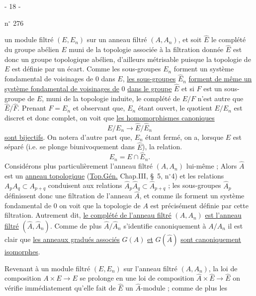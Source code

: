 \begin{center}- 18 -\end{center}
\hfill n$^\circ$ 276

un module filtré $(E,E_n)$ sur un anneau filtré $(A,A_n)$, et soit $\hat E$ le complété du groupe abélien $E$ muni de la topologie associée à la filtration donnée $\hat E$ est donc un groupe topologique abélien, d'ailleurs métrisable puisque la topologie de $E$ est définie par un écart. Comme les sous-groupes $E_n$ forment un système fondamental de voisinages de 0 dans $E$, \uline{les sous-groupes} $\hat E_n$ \uline{forment de même un système fondamental de voisinages de} 0 \uline{dans le groupe} $\hat E$ et si $F$ est un sous-groupe de $E$, muni de la topologie induite, le complété de $E/F$ n'est autre que $\hat E/\hat F$. Prenant $F=E_n$ et observant que, $E_n$ étant ouvert, le quotient $E/E_n$ est discret et donc complet, on voit que \uline{les homomorphismes canoniques}
\[
E/E_n\longrightarrow\hat E/\hat E_n
\]
\uline{sont bijectifs}. On notera d'autre part que, $E_n$ étant fermé, on a, lorsque $E$ est séparé (i.e. se plonge biunivoquement dans $\hat E$), la relation.
\[
E_n=E\cap\hat E_n.
\]
Considérons plus particulièrement l'anneau filtré $(A,A_n)$ lui-même ; Alors $\hat A$ est un \uline{anneau topologique} (\uline{Top.Gén.} Chap.III, \S\ 5, n$^\circ$4) et les relations $A_pA_q\subset A_{p+q}$ conduisent aux relations $\hat A_p\hat A_q\subset\hat A_{p+q}$ ; les sous-groupes $\hat A_p$ définissent donc une filtration de l'anneau $\hat A$, et comme ils forment un système fondamental de 0 on voit que la topologie de $A$ est précisément définie par cette filtration. Autrement dit, \uline{le complété de l'anneau filtré} $(A,A_n)$ \uline{est l'anneau filtré} $(\hat A,\hat A_n)$. Comme de plus $\hat A/\hat A_n$ s'identifie canoniquement à $A/A_n$ il est clair que \uline{les anneaux gradués associés} $G(A)$ \uline{et} $G(\hat A)$ \uline{sont canoniquement isomorphes}.

Revenant à un module filtré $(E,E_n)$ sur l'anneau filtré $(A,A_n)$, la loi de composition $A\times E\longrightarrow E$ se prolonge en une loi de composition $\hat A\times\hat E\longrightarrow\hat E$ on vérifie immédiatement qu'elle fait de $\hat E$ un $\hat A$-module ; comme de plus les
